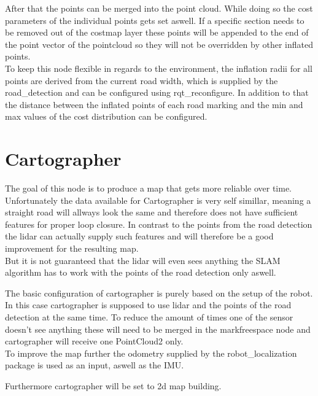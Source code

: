 After that the points can be merged into the point cloud. While doing so the cost parameters of the individual points gets set aswell. If a specific section needs to be removed out of the costmap layer these points will be appended to the end of the point vector of the pointcloud so they will not be overridden by other inflated points.\\

To keep this node flexible in regards to the environment, the inflation radii for all points are derived from the current road width, which is supplied by the road\_detection and can be configured using rqt\_reconfigure. 
In addition to that the distance between the inflated points of each road marking and the min and max values of the cost distribution can be configured.


\section{Cartographer}
The goal of this node is to produce a map that gets more reliable over time.\\

Unfortunately the data available for Cartographer is very self simillar, meaning a straight road will allways look the same and therefore does not have sufficient features for proper loop closure. In contrast to the points from the road detection the lidar can actually supply such features and will therefore be a good improvement for the resulting map.\\

But it is not guaranteed that the lidar will even sees anything the SLAM algorithm has to work with the points of the road detection only aswell.

The basic configuration of cartographer is purely based on the setup of the robot. In this case cartographer is supposed to use lidar and the points of the road detection at the same time. To reduce the amount of times one of the sensor doesn't see anything these will need to be merged in the markfreespace node and cartographer will receive one PointCloud2 only.\\
To improve the map further the odometry supplied by the robot\_localization package is used as an input, aswell as the IMU.

Furthermore cartographer will be set to 2d map building.


